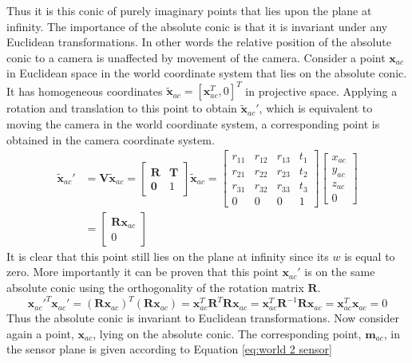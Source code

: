 \documentclass[12pt,oneside,openany,a4paper, %
english, %
masters-t, goldenblock]{usthesis}
\begin{document}
Thus it is this conic of purely imaginary points that lies upon the plane at infinity. The importance of the absolute conic is that it is invariant under any Euclidean transformations. In other words the relative position of the absolute conic to a camera is unaffected by movement of the camera. Consider a point $\bm{x}_{ac}$ in Euclidean space in the world coordinate system that lies on the absolute conic. It has homogeneous coordinates $\tilde{\bm{x}}_{ac}=[\bm{x}_{ac}^T, 0]^T$ in projective space. Applying a rotation and translation to this point to obtain $\tilde{\bm{x}}_{ac}'$, which is equivalent to moving the camera in the world coordinate system, a corresponding point is obtained in the camera coordinate system.
\begin{align}
  \tilde{\bm{x}}_{ac}' &=
  \bm{V} \tilde{\bm{x}}_{ac} =
  \begin{bmatrix}
  \bm{R} & \bm{T} \\
  \bm{0} & 1
  \end{bmatrix}
  \tilde{\bm{x}}_{ac} =
  \begin{bmatrix}
  r_{11} & r_{12} & r_{13} & t_1 \\
  r_{21} & r_{22} & r_{23} & t_2 \\
  r_{31} & r_{32} & r_{33} & t_3 \\
  0 & 0 & 0 & 1
  \end{bmatrix}
  \begin{bmatrix}
  x_{ac} \\
  y_{ac} \\
  z_{ac} \\
  0
  \end{bmatrix} \\
  &= 
  \begin{bmatrix}
  \bm{R} \bm{x}_{ac} \\
  0
  \end{bmatrix}
\end{align}
It is clear that this point still lies on the plane at infinity since its $w$ is equal to zero. More importantly it can be proven that this point $\bm{x}_{ac}'$ is on the same absolute conic using the orthogonality of the rotation matrix $\bm{R}$.
\begin{equation}
  \bm{x}_{ac}'^T \bm{x}_{ac}' = \left( \bm{R} \bm{x}_{ac} \right) ^T \left( \bm{R} \bm{x}_{ac} \right) = \bm{x}_{ac}^T \bm{R}^T \bm{R} \bm{x}_{ac} = \bm{x}_{ac}^T \bm{R}^{-1} \bm{R} \bm{x}_{ac} = \bm{x}_{ac}^T \bm{x}_{ac} = 0
\end{equation}
Thus the absolute conic is invariant to Euclidean transformations. Now consider again a point, $\bm{x}_{ac}$, lying on the absolute conic. The corresponding point, $\bm{m}_{ac}$, in the sensor plane is given according to Equation \ref{eq:world 2 sensor}
\end{document}
